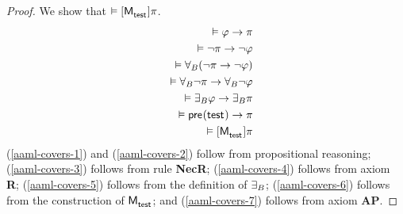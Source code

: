 \begin{proof}
We show that $\entails \actionA{\aPModel{\aStateTest}} \pi$.
\begin{eqnarray}
    && \entails \phi \implies \pi \label{aaml-covers-1}\\
    && \entails \lnot \pi \implies \lnot \phi \label{aaml-covers-2}\\
    && \entails  \allactsBs (\lnot \pi \implies \lnot \phi) \label{aaml-covers-3}\\
    && \entails  \allactsBs \lnot \pi \implies \allactsBs \lnot \phi \label{aaml-covers-4}\\
    && \entails  \someactsBs \phi \implies \someactsBs \pi \label{aaml-covers-5}\\
    && \entails  \aPrecondition(\aStateTest) \implies \pi \label{aaml-covers-6}\\
    && \entails  \actionA{\aPModel{\aStateTest}} \pi \label{aaml-covers-7}
\end{eqnarray}
(\ref{aaml-covers-1}) and
(\ref{aaml-covers-2}) follow from propositional reasoning;
(\ref{aaml-covers-3}) follows from \axiomAamlK{} rule {\bf NecR};
(\ref{aaml-covers-4}) follows from \axiomAamlK{} axiom {\bf R};
(\ref{aaml-covers-5}) follows from the definition of ${\exists_{B}}$;
(\ref{aaml-covers-6}) follows from the construction of $\aPModel{\aStateTest}$; and
(\ref{aaml-covers-7}) follows from \axiomAamlK{} axiom {\bf AP}.


\end{proof}
